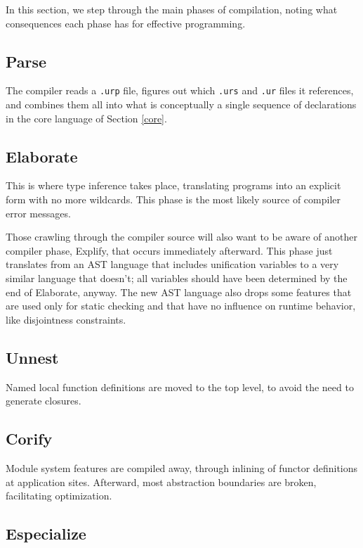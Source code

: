 \documentclass{article}
\begin{document}
In this section, we step through the main phases of compilation, noting what consequences each phase has for effective programming.

\subsection{Parse}

The compiler reads a \texttt{.urp} file, figures out which \texttt{.urs} and \texttt{.ur} files it references, and combines them all into what is conceptually a single sequence of declarations in the core language of Section \ref{core}.

\subsection{Elaborate}

This is where type inference takes place, translating programs into an explicit form with no more wildcards.  This phase is the most likely source of compiler error messages.

Those crawling through the compiler source will also want to be aware of another compiler phase, Explify, that occurs immediately afterward.  This phase just translates from an AST language that includes unification variables to a very similar language that doesn't; all variables should have been determined by the end of Elaborate, anyway.  The new AST language also drops some features that are used only for static checking and that have no influence on runtime behavior, like disjointness constraints.

\subsection{Unnest}

Named local function definitions are moved to the top level, to avoid the need to generate closures.

\subsection{Corify}

Module system features are compiled away, through inlining of functor definitions at application sites.  Afterward, most abstraction boundaries are broken, facilitating optimization.

\subsection{Especialize}
\end{document}
